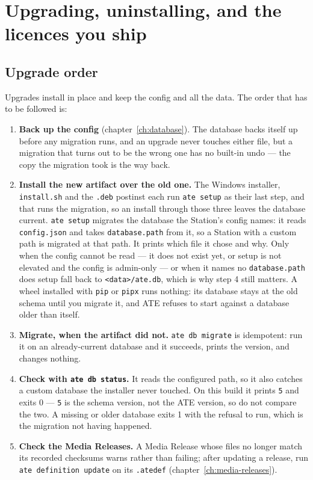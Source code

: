 \chapter{Upgrading, uninstalling, and the licences you ship}\label{ch:upgrades}

\section{Upgrade order}

Upgrades install in place and keep the config and all the data. The order that has to be followed
is:

\begin{enumerate}
  \item \textbf{Back up the config} (chapter~\ref{ch:database}). The database backs itself up
    before any migration runs, and an upgrade never touches either file, but a migration that
    turns out to be the wrong one has no built-in undo --- the copy the migration took is the
    way back.
  \item \textbf{Install the new artifact over the old one.} The Windows installer, \texttt{install.sh}
    and the \texttt{.deb} postinst each run \texttt{ate setup} as their last step, and that runs the
    migration, so an install through those three leaves the database current. \texttt{ate setup}
    migrates the database the Station's config names: it reads \texttt{config.json} and takes
    \texttt{database.path} from it, so a Station with a custom path is migrated at that path. It
    prints which file it chose and why. Only when the config cannot be read --- it does not exist
    yet, or setup is not elevated and the config is admin-only --- or when it names no
    \texttt{database.path} does setup fall back to \texttt{\textless data\textgreater/ate.db}, which
    is why step 4 still matters. A wheel
    installed with \texttt{pip} or \texttt{pipx} runs nothing: its database stays at the old schema
    until you migrate it, and ATE refuses to start against a database older than itself.
  \item \textbf{Migrate, when the artifact did not.}
    \texttt{ate db migrate} is idempotent: run it on an already-current database and it succeeds,
    prints the version, and changes nothing.
  \item \textbf{Check with \texttt{ate db status}.} It reads the configured path, so it also catches a
    custom database the installer never touched. On this build it prints \texttt{5} and exits 0 ---
    \texttt{5} is the schema version, not the ATE version, so do not compare the two. A missing or
    older database exits 1 with the refusal to run, which is the migration not having happened.
  \item \textbf{Check the Media Releases.} A Media Release whose files no longer match its recorded
    checksums warns rather than failing; after updating a release, run \texttt{ate definition update}
    on its \texttt{.atedef} (chapter~\ref{ch:media-releases}).
\end{enumerate}

